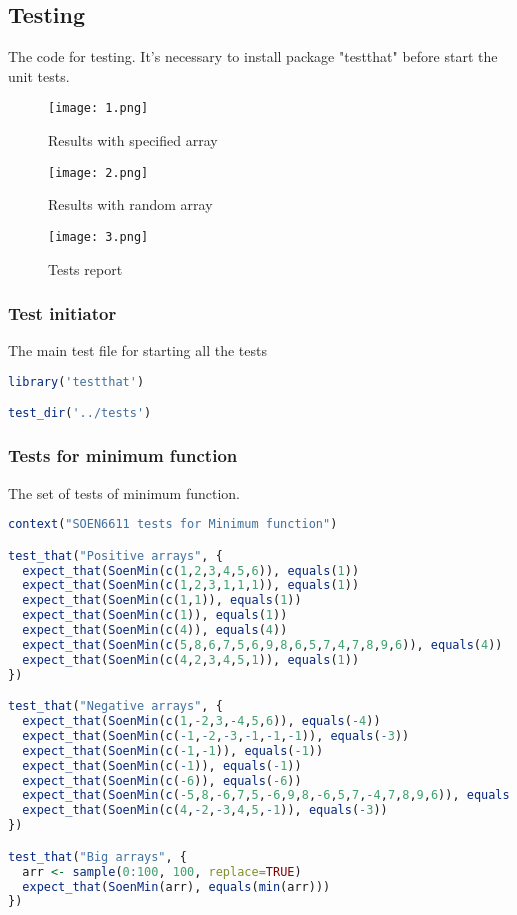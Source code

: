 \documentclass[12pt]{article}
\begin{document}
\subsection{Testing}
The code for testing. It's necessary to install package "testthat" before start the unit tests.
\begin{figure}[h]
\centering
\texttt{[image: 1.png]}
\caption{Results with specified array}
\end{figure}
\begin{figure}[h]
\centering
\texttt{[image: 2.png]}
\caption{Results with random array}
\end{figure}
\newpage
\begin{figure}[h]
\centering
\texttt{[image: 3.png]}
\caption{Tests report}
\end{figure}
\subsubsection{Test initiator}
The main test file for starting all the tests
\begin{lstlisting}[language=R]
library('testthat')

test_dir('../tests')
\end{lstlisting}
\subsubsection{Tests for minimum function}
The set of tests of minimum function.
\begin{lstlisting}[language=R]
context("SOEN6611 tests for Minimum function")

test_that("Positive arrays", {
  expect_that(SoenMin(c(1,2,3,4,5,6)), equals(1))
  expect_that(SoenMin(c(1,2,3,1,1,1)), equals(1))
  expect_that(SoenMin(c(1,1)), equals(1))
  expect_that(SoenMin(c(1)), equals(1))
  expect_that(SoenMin(c(4)), equals(4))
  expect_that(SoenMin(c(5,8,6,7,5,6,9,8,6,5,7,4,7,8,9,6)), equals(4))
  expect_that(SoenMin(c(4,2,3,4,5,1)), equals(1))
})

test_that("Negative arrays", {
  expect_that(SoenMin(c(1,-2,3,-4,5,6)), equals(-4))
  expect_that(SoenMin(c(-1,-2,-3,-1,-1,-1)), equals(-3))
  expect_that(SoenMin(c(-1,-1)), equals(-1))
  expect_that(SoenMin(c(-1)), equals(-1))
  expect_that(SoenMin(c(-6)), equals(-6))
  expect_that(SoenMin(c(-5,8,-6,7,5,-6,9,8,-6,5,7,-4,7,8,9,6)), equals(-6))
  expect_that(SoenMin(c(4,-2,-3,4,5,-1)), equals(-3))
})

test_that("Big arrays", {
  arr <- sample(0:100, 100, replace=TRUE)
  expect_that(SoenMin(arr), equals(min(arr)))
})
\end{lstlisting}
\end{document}
